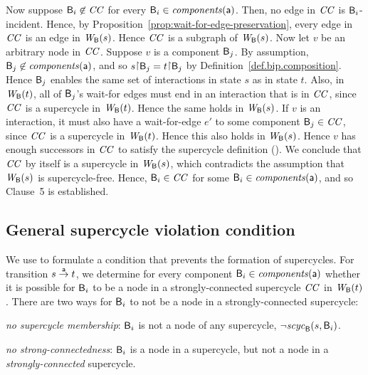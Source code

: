 Now suppose $\B_i \not\in \CC$ for every $\B_i \in \cmps{\act}$. Then, no edge in $\CC$ is
$\B_i$-incident.  Hence, by Proposition~\ref{prop:wait-for-edge-preservation}, every edge in $\CC$
is an edge in $\wfg{\B}{s}$. Hence $\CC$ is a subgraph of $\wfg{\B}{s}$.
%
Now let $v$ be an arbitrary node in $\CC$.
%
Suppose $v$ is a component $\B_j$.  By assumption, $\B_j \not\in \cmps{\act}$, and so
$s \pj \B_j = t \pj \B_j$ by Definition~\ref{def.bip.composition}. Hence $\B_j$ enables the same set
of interactions in state $s$ as in state $t$. Also, in $\wfg{\B}{t}$, all of $\B_j$'s wait-for edges
must end in an interaction that is in $\CC$, since $\CC$ is a supercycle in $\wfg{\B}{t}$. Hence the
same holds in $\wfg{\B}{s}$.
%
If $v$ is an interaction, it must also have a wait-for-edge $e'$ to some component $\B_j \in \CC$,
since $\CC$ is a supercycle in $\wfg{\B}{t}$. Hence this also holds in $\wfg{\B}{s}$.
%
Hence $v$ has enough successors in $\CC$ to satisfy the supercycle definition ().
%
We conclude that $\CC$ by itself is a supercycle in $\wfg{\B}{s}$, which contradicts the assumption
that $\wfg{\B}{s}$ is supercycle-free. Hence, $\B_i \in \CC$ for some $\B_i \in \cmps{\act}$, and so
Clause~5 is established.  
\epr




\subsection{General supercycle violation condition}

We use  to formulate a condition that prevents the formation of
supercycles. 
For transition $s \goesto[\act] t$, we determine for every component $\B_i \in \cmps{\act}$ whether
it is possible for $\B_i$ to be a node in a strongly-connected supercycle $\CC$ in $\wfg{\B}{t}$. 
There are two ways for $\B_i$ to not be a node in a strongly-connected supercycle:
\bn
\item \textit{no supercycle membership}: $\B_i$ is not a node of any supercycle, \ie $\neg \scyc{\B}{s}{\B_i}$.

\item \textit{no strong-connectedness}: $\B_i$ is a node in a supercycle, but not a node in a \emph{strongly-connected} supercycle. 


